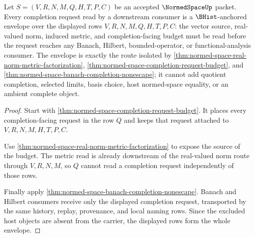 \begin{theorem}
\label{thm:normedspace-completion-budget-envelope}
Let $S=(V,R,N,M,Q,H,T,P,C)$ be an accepted $\NormedSpaceUp$ packet. Every completion request read by a downstream consumer is a $\BHist$-anchored envelope over the displayed rows $V,R,N,M,Q,H,T,P,C$: the vector source, real-valued norm, induced metric, and completion-facing budget must be read before the request reaches any Banach, Hilbert, bounded-operator, or functional-analysis consumer. The envelope is exactly the route isolated by \autoref{thm:normed-space-real-norm-metric-factorization}, \autoref{thm:normed-space-completion-request-budget}, and \autoref{thm:normed-space-banach-completion-nonescape}; it cannot add quotient completion, selected limits, basis choice, host normed-space equality, or an ambient complete object.
\end{theorem}
\begin{proof}
Start with \autoref{thm:normed-space-completion-request-budget}. It places every completion-facing request in the row $Q$ and keeps that request attached to $V,R,N,M,H,T,P,C$.

Use \autoref{thm:normed-space-real-norm-metric-factorization} to expose the source of the budget. The metric read is already downstream of the real-valued norm route through $V,R,N,M$, so $Q$ cannot read a completion request independently of those rows.

Finally apply \autoref{thm:normed-space-banach-completion-nonescape}. Banach and Hilbert consumers receive only the displayed completion request, transported by the same history, replay, provenance, and local naming rows. Since the excluded host objects are absent from the carrier, the displayed rows form the whole envelope.
\end{proof}

